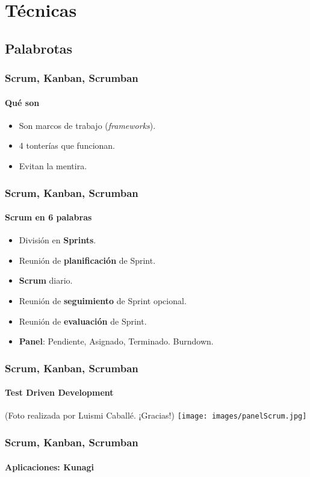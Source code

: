  \section{Técnicas}

  \subsection{Palabrotas}

  \begin{frame}
   \frametitle{Scrum, Kanban, Scrumban}
   \framesubtitle{Qué son}

   \begin{itemize}
    \item Son marcos de trabajo (\textit{frameworks}).
    \item 4 tonterías que funcionan.
    \item Evitan la mentira.
   \end{itemize}
  \end{frame}

  \begin{frame}
   \frametitle{Scrum, Kanban, Scrumban}
   \framesubtitle{Scrum en 6 palabras}

   \begin{itemize}
    \item<1-> División en \textbf{Sprints}.
    \item<2-> Reunión de \textbf{planificación} de Sprint.
    \item<3-> \textbf{Scrum} diario.
    \item<4-> Reunión de \textbf{seguimiento} de Sprint opcional.
    \item<5-> Reunión de \textbf{evaluación} de Sprint.
    \item<6-> \textbf{Panel}: Pendiente, Asignado, Terminado. Burndown.
   \end{itemize}
  \end{frame}

  \begin{frame}
   \frametitle{Scrum, Kanban, Scrumban}
   \framesubtitle{Test Driven Development}
   \begin{center}
    {\small (Foto realizada por Luismi Caballé. ¡Gracias!)}
    \texttt{[image: images/panelScrum.jpg]}
   \end{center}
  \end{frame}

  \begin{frame}
   \frametitle{Scrum, Kanban, Scrumban}
   \framesubtitle{Aplicaciones: Kunagi}
   \begin{center}
   \end{center}

  \end{frame}


